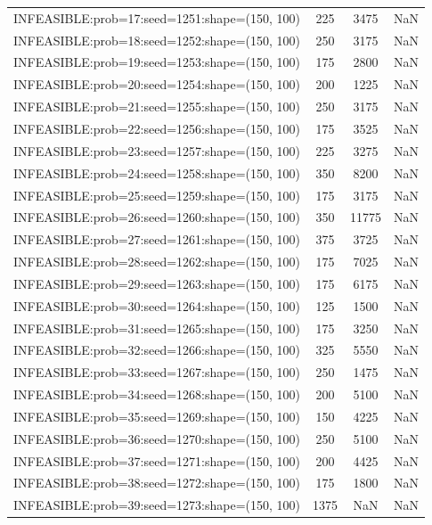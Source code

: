 \begin{longtable}{lccc}
INFEASIBLE:prob=17:seed=1251:shape=(150, 100)  &      225 &  3475 &    NaN \\
INFEASIBLE:prob=18:seed=1252:shape=(150, 100)  &      250 &  3175 &    NaN \\
INFEASIBLE:prob=19:seed=1253:shape=(150, 100)  &      175 &  2800 &    NaN \\
INFEASIBLE:prob=20:seed=1254:shape=(150, 100)  &      200 &  1225 &    NaN \\
INFEASIBLE:prob=21:seed=1255:shape=(150, 100)  &      250 &  3175 &    NaN \\
INFEASIBLE:prob=22:seed=1256:shape=(150, 100)  &      175 &  3525 &    NaN \\
INFEASIBLE:prob=23:seed=1257:shape=(150, 100)  &      225 &  3275 &    NaN \\
INFEASIBLE:prob=24:seed=1258:shape=(150, 100)  &      350 &  8200 &    NaN \\
INFEASIBLE:prob=25:seed=1259:shape=(150, 100)  &      175 &  3175 &    NaN \\
INFEASIBLE:prob=26:seed=1260:shape=(150, 100)  &      350 & 11775 &    NaN \\
INFEASIBLE:prob=27:seed=1261:shape=(150, 100)  &      375 &  3725 &    NaN \\
INFEASIBLE:prob=28:seed=1262:shape=(150, 100)  &      175 &  7025 &    NaN \\
INFEASIBLE:prob=29:seed=1263:shape=(150, 100)  &      175 &  6175 &    NaN \\
INFEASIBLE:prob=30:seed=1264:shape=(150, 100)  &      125 &  1500 &    NaN \\
INFEASIBLE:prob=31:seed=1265:shape=(150, 100)  &      175 &  3250 &    NaN \\
INFEASIBLE:prob=32:seed=1266:shape=(150, 100)  &      325 &  5550 &    NaN \\
INFEASIBLE:prob=33:seed=1267:shape=(150, 100)  &      250 &  1475 &    NaN \\
INFEASIBLE:prob=34:seed=1268:shape=(150, 100)  &      200 &  5100 &    NaN \\
INFEASIBLE:prob=35:seed=1269:shape=(150, 100)  &      150 &  4225 &    NaN \\
INFEASIBLE:prob=36:seed=1270:shape=(150, 100)  &      250 &  5100 &    NaN \\
INFEASIBLE:prob=37:seed=1271:shape=(150, 100)  &      200 &  4425 &    NaN \\
INFEASIBLE:prob=38:seed=1272:shape=(150, 100)  &      175 &  1800 &    NaN \\
INFEASIBLE:prob=39:seed=1273:shape=(150, 100)  &     1375 &   NaN &    NaN \\

\end{longtable}
